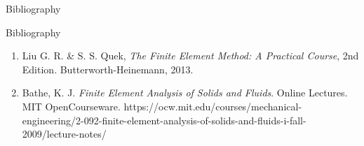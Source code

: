 \documentclass{beamer}
\begin{document}
\begin{section}{Bibliography}
    \begin{frame}{Bibliography}
    \begin{enumerate}
        \item Liu G. R. \& S. S. Quek, \textit{The Finite Element Method: A Practical Course}, 2nd Edition. Butterworth-Heinemann, 2013.
        \item Bathe, K. J. \textit{Finite Element Analysis of Solids and Fluids}. Online Lectures. MIT OpenCourseware. https://ocw.mit.edu/courses/mechanical-engineering/2-092-finite-element-analysis-of-solids-and-fluids-i-fall-2009/lecture-notes/
    \end{enumerate}
    \end{frame}
\end{section}
\end{document}
